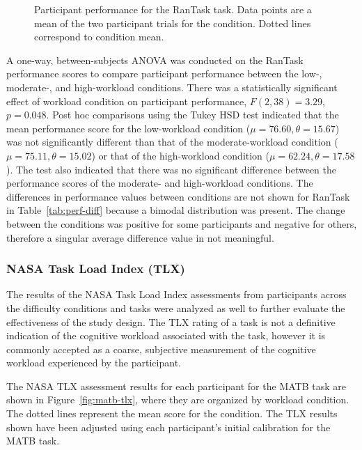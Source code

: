 \documentclass[11pt]{article}
\begin{document}
		\begin{figure}
		\centering
		\caption[Participant Performance on RanTask Task]{Participant performance for the RanTask task. Data points are a mean of the two participant trials for the condition. Dotted lines correspond to condition mean.}
		\label{fig:rantask-perf}
		\end{figure} 
		
		A one-way, between-subjects ANOVA was conducted on the RanTask performance scores to compare participant performance between the low-, moderate-, and high-workload conditions. There was a statistically significant effect of workload condition on participant performance, \(F(2, 38) = 3.29\), \(p=0.048\). Post hoc comparisons using the Tukey HSD test indicated that the mean performance score for the low-workload condition (\(\mu = 76.60, \theta = 15.67 \)) was not significantly different than that of the moderate-workload condition (\(\mu = 75.11, \theta = 15.02\)) or that of the high-workload condition (\(\mu = 62.24, \theta = 17.58\)). The test also indicated that there was no significant difference between the performance scores of the moderate- and high-workload conditions. The differences in performance values between conditions are not shown for RanTask in Table~\ref{tab:perf-diff} because a bimodal distribution was present. The change between the conditions was positive for some participants and negative for others, therefore a singular average difference value in not meaningful.
		
		\subsubsection{NASA Task Load Index (TLX)}
		The results of the NASA Task Load Index assessments from participants across the difficulty conditions and tasks were analyzed as well to further evaluate the effectiveness of the study design. The TLX rating of a task is not a definitive indication of the cognitive workload associated with the task, however it is commonly accepted as a coarse, subjective measurement of the cognitive workload experienced by the participant.
		
		
		The NASA TLX assessment results for each participant  for the MATB task are shown in Figure~\ref{fig:matb-tlx}, where they are organized by workload condition. The dotted lines represent the mean score for the condition. The TLX results shown have been adjusted using each participant's initial calibration for the MATB task. 
		
\end{document}
